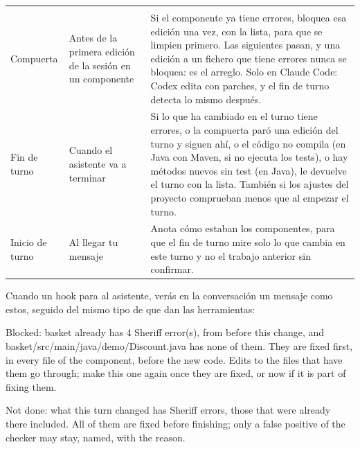 \documentclass[11pt,a4paper]{article}
\begin{document}
\begin{center}
\begin{tabularx}{\linewidth}{@{\hspace{6pt}}K{24mm}>{\raggedright\arraybackslash}p{35mm}L}
\headrow {} &  &  \\
Compuerta & Antes de la primera edición de la sesión en un componente &
  Si el componente ya tiene errores, bloquea esa edición una vez, con la lista,
  para que se limpien primero. Las siguientes pasan, y una edición a un fichero
  que tiene errores nunca se bloquea: es el arreglo. Solo en Claude Code: Codex
  edita con parches, y el fin de turno detecta lo mismo después. \\
Fin de turno & Cuando el asistente va a terminar &
  Si lo que ha cambiado en el turno tiene errores, o la compuerta paró una
  edición del turno y siguen ahí, o el código no compila (en Java con Maven,
  si no ejecuta los tests), o hay métodos nuevos sin test (en Java), le
  devuelve el turno con la lista. También si los ajustes del proyecto
  comprueban menos que al empezar el turno. \\
Inicio de turno & Al llegar tu mensaje &
  Anota cómo estaban los componentes, para que el fin de turno mire solo lo que
  cambia en este turno y no el trabajo anterior sin confirmar. \\
\end{tabularx}
\end{center}

Cuando un hook para al asistente, verás en la conversación un mensaje como
estos, seguido del mismo tipo de  que dan las herramientas:

\begin{answer}[Compuerta]
Blocked: basket already has 4 Sheriff error(s), from before this change, and basket/src/main/java/demo/Discount.java
has none of them. They are fixed first, in every file of the component, before the
new code. Edits to the files that have them go through; make this one again once
they are fixed, or now if it is part of fixing them.
\end{answer}

\begin{answer}
Not done: what this turn changed has Sheriff errors, those that were already there
included. All of them are fixed before finishing; only a false positive of the checker
may stay, named, with the reason.
\end{answer}
\end{document}
